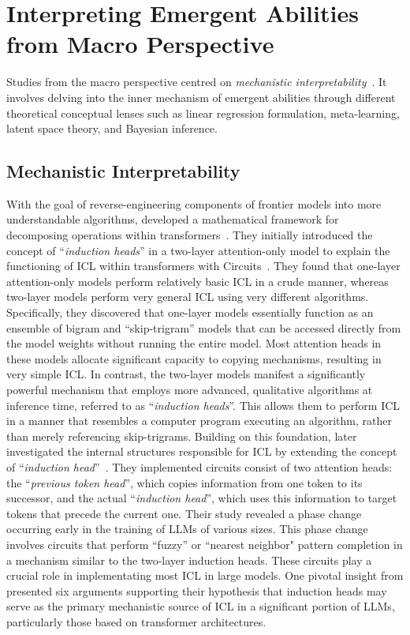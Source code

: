 % 
% 
\section{Interpreting Emergent Abilities from Macro Perspective}
Studies from the macro perspective centred on \textit{mechanistic interpretability}~\cite{Olah2022MI}. It involves delving into the inner mechanism of emergent abilities through different theoretical conceptual lenses such as linear regression formulation, meta-learning, latent space theory, and Bayesian inference.
\subsection{Mechanistic Interpretability}
With the goal of reverse-engineering components of frontier models into more understandable algorithms, \citet{elhage2021mathematical} developed a mathematical framework for decomposing operations within  transformers~\cite{Vaswani2017AttentionIA}. They initially introduced the concept of ``\textit{induction heads}'' in a two-layer attention-only model to explain the functioning of ICL within transformers with Circuits~\cite{cammarata2020thread}.
They found that one-layer attention-only models perform relatively basic ICL in a crude manner, whereas two-layer models perform very general ICL using very different algorithms.
Specifically, they discovered that one-layer models essentially function as an ensemble of bigram and “skip-trigram” models that can be accessed directly from the model weights without running the entire model. Most attention heads in these models allocate significant capacity to copying mechanisms, resulting in very simple ICL.
In contrast, the two-layer models manifest a significantly powerful mechanism that employs more advanced, qualitative algorithms at inference time, referred to as ``\emph{induction heads}''. 
This allows them to perform ICL in a manner that resembles a computer program executing an algorithm, rather than merely referencing skip-trigrams. 
Building on this foundation, \citet{Olsson2022IncontextLA} later investigated the internal structures responsible for ICL by extending the concept of ``\emph{induction head}''~\cite{elhage2021mathematical}. They implemented  circuits consist of two attention heads: the ``\emph{previous token head}'', which copies information from one token to its successor, and the actual ``\emph{induction head}'', which uses this information to target tokens that precede the current one.
Their study revealed a phase change occurring early in the training of LLMs of various sizes. This phase change involves circuits that perform ``fuzzy'' or ``nearest neighbor" pattern completion in a mechanism similar to the two-layer induction heads. These circuits play a crucial role in implementating most ICL in large models.
One pivotal insight from \cite{Olsson2022IncontextLA} presented six arguments supporting their hypothesis that induction heads may serve as the primary mechanistic source of ICL in a significant portion of LLMs, particularly those based on transformer architectures.

